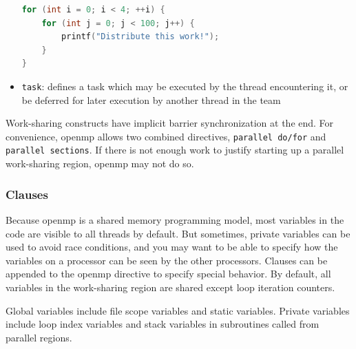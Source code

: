 \documentclass[10pt]{article}
\newcounter{subsubsubsection}[subsubsection]
\begin{document}
\begin{flushleft}
\begin{itemize}
\begin{lstlisting}[language=C, basicstyle=\ttfamily\small]
for (int i = 0; i < 4; ++i) { 
	for (int j = 0; j < 100; j++) {
		printf("Distribute this work!");
	}
}
\end{lstlisting}
\item {\tt task}: defines a task which may be executed by the thread encountering it, or be deferred for later execution by another thread in the team
\end{itemize}

Work-sharing constructs have implicit barrier synchronization at the end. For convenience, \gls{openmp} allows two combined directives, {\tt parallel do/for} and {\tt parallel sections}. If there is not enough work to justify starting up a parallel work-sharing region, \gls{openmp} may not do so.

\subsubsection{Clauses}

Because \gls{openmp} is a shared memory programming model, most variables in the code are visible to all threads by default. But sometimes, private variables can be used to avoid race conditions, and you may want to be able to specify how the variables on a processor can be seen by the other processors. Clauses can be appended to the \gls{openmp} directive to specify special behavior. By default, all variables in the work-sharing region are shared except loop iteration counters.


Global variables include file scope variables and static variables. Private variables include loop index variables and stack variables in subroutines called from parallel regions.


\end{flushleft}
\end{document}
